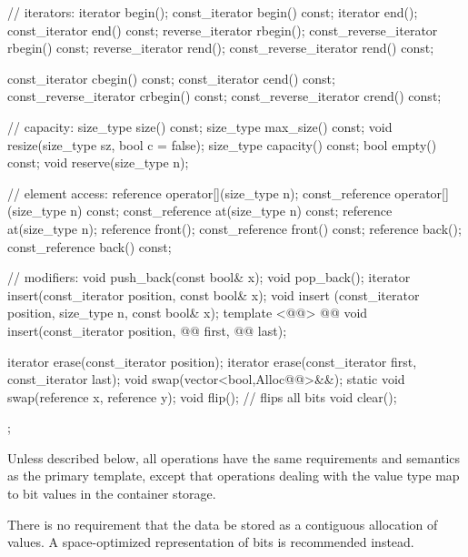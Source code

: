 \documentclass[american,twoside]{book}
\begin{document}
\begin{codeblock}
{{    // iterators:
    iterator               begin();
    const_iterator         begin() const;
    iterator               end();
    const_iterator         end() const;
    reverse_iterator       rbegin();
    const_reverse_iterator rbegin() const;
    reverse_iterator       rend();
    const_reverse_iterator rend() const;

    const_iterator         cbegin() const;
    const_iterator         cend() const;
    const_reverse_iterator crbegin() const;
    const_reverse_iterator crend() const;

    // capacity:
    size_type size() const;
    size_type max_size() const;
    void      resize(size_type sz, bool c = false);
    size_type capacity() const;
    bool      empty() const;
    void      reserve(size_type n);

    // element access:
    reference       operator[](size_type n);
    const_reference operator[](size_type n) const;
    const_reference at(size_type n) const;
    reference       at(size_type n);
    reference       front();
    const_reference front() const;
    reference       back();
    const_reference back() const;

    // modifiers:
    void push_back(const bool& x);
    void pop_back();
    iterator insert(const_iterator position, const bool& x);
    void     insert (const_iterator position, size_type n, const bool& x);
    template <@@>
        @@
        void insert(const_iterator position,
                    @@ first, @@ last);

    iterator erase(const_iterator position);
    iterator erase(const_iterator first, const_iterator last);
    void swap(vector<bool,Alloc@@>&&);
    static void swap(reference x, reference y);
    void flip();                // flips all bits
    void clear();
  };

}
\end{codeblock}%

\pnum
Unless described below, all operations have the same requirements and
semantics as the primary  template, except that operations
dealing with the  value type map to bit values in the
container storage.

\pnum
There is no requirement that the data be stored as a contiguous allocation
of  values. A space-optimized representation of bits is
recommended instead.
\end{document}
